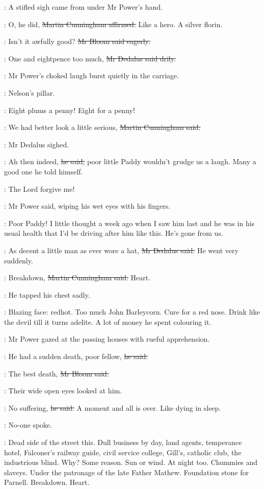 :
A stifled sigh came from under Mr Power's hand.

\cunningham:
O, he did,
\sout{Martin Cunningham affirmed.}
Like a hero.
A silver florin.

\Bloom:
Isn't it awfully good?
\sout{Mr Bloom said eagerly.}

\simon:
One and eightpence too much,
\sout{Mr Dedalus said drily.}

:
Mr Power's choked laugh burst quietly in the carriage.

\BloomInt:
Nelson's pillar.

\woman:
Eight plums a penny!
Eight for a penny!

\cunningham:
We had better look a little serious,
\sout{Martin Cunningham said.}

:
Mr Dedalus sighed.

\simon:
Ah then indeed,
\sout{he said,}
poor little Paddy wouldn't grudge us a laugh.
Many a good one he told himself.

\power:
The Lord forgive me!

:
Mr Power said,
wiping his wet eyes with his fingers.

\power:
Poor Paddy!
I little thought a week ago
when I saw him last
and he was in his usual health
that I'd be driving after him like this.
He's gone from us.

\simon:
As decent a little man as ever wore a hat,
\sout{Mr Dedalus said.}
He went very suddenly.

\cunningham:
Breakdown,
\sout{Martin Cunningham said.}
Heart.

:
He tapped his chest sadly.

\BloomInt:
Blazing face:
redhot.
Too much John Barleycorn.
Cure for a red nose.
Drink like the devil till it turns adelite.
A lot of money he spent colouring it.

:
Mr Power gazed at the passing houses
with rueful apprehension.

\power:
He had a sudden death, poor fellow,
\sout{he said.}

\Bloom:
The best death,
\sout{Mr Bloom said.}

:
Their wide open eyes looked at him.

\Bloom:
No suffering,
\sout{he said.}
A moment and all is over.
Like dying in sleep.

:
No-one spoke.

\BloomInt:
Dead side of the street this.
Dull business by day,
land agents, temperance hotel,
Falconer's railway guide, civil service college,
Gill's, catholic club, the industrious blind.
Why?
Some reason.
Sun or wind.
At night too.
Chummies and slaveys.
Under the patronage of the late Father Mathew.
Foundation stone for Parnell.
Breakdown.
Heart.

